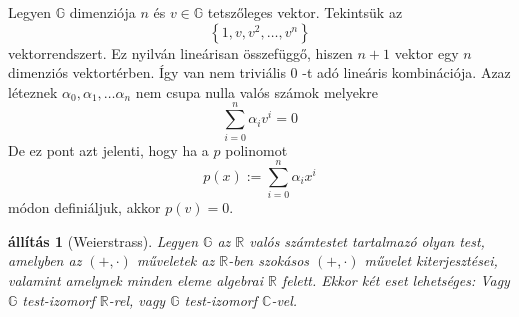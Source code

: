 \documentclass[a4paper, showtrims]{memoir}
\makeatletter
\renewenvironment{proof}[1][\proofname]
    {\par\pushQED{\qed}%
    \normalfont \topsep6\p@\@plus6\p@\relax
    \trivlist
    \item[\hskip\labelsep
        \itshape
    #1\@addpunct{:}]\ignorespaces}
    {\popQED\endtrivlist\@endpefalse}
\theoremstyle{plain}
\newtheorem{proposition}{állítás}[chapter]
\theoremstyle{remark}
\theoremstyle{definition}
\makeatother
\begin{document}
\begin{proof}
	Legyen $\mathbb{G}$ dimenziója $n$ és $v\in \mathbb{G}$ tetszőleges
	vektor.
	Tekintsük az
	\[
		\left\{ 1,v,v^{2},\ldots ,v^{n}\right\}
	\]
	vektorrendszert.
	Ez nyilván lineárisan összefüggő,
	hiszen $n+1$ vektor egy $n$ dimenziós vektortérben.
	\'{I}gy van nem
	triviális $0$ -t adó lineáris kombinációja.
	Azaz léteznek $\alpha _{0},\alpha _{1},\ldots \alpha _{n}$ nem csupa nulla valós számok melyekre
	\[
		\sum_{i=0}^{n}\alpha _{i}v^{i}=0
	\]
	De ez pont azt jelenti, hogy ha a $p$ polinomot
	\[
		p\left( x\right) :=\sum_{i=0}^{n}\alpha _{i}x^{i}
	\]
	módon definiáljuk, akkor $p\left( v\right) =0$.
\end{proof}

\begin{proposition}[Weierstrass]
	Legyen $\mathbb{G}$ az $\mathbb{R}$ valós számtestet tartalmazó olyan
	test, amelyben az $\left( +,\cdot \right) $ műveletek az $\mathbb{R}$-ben
	szokásos $\left( +,\cdot \right) $ művelet kiterjesztései,
	valamint amelynek minden eleme algebrai $\mathbb{R}$ felett.
	Ekkor két eset
	lehetséges: Vagy $\mathbb{G}$ test-izomorf $\mathbb{R}$-rel, vagy $\mathbb{G}$
	test-izomorf $\mathbb{C}$-vel.
\end{proposition}
\end{document}
